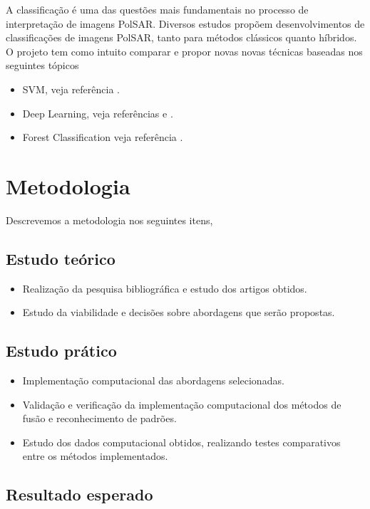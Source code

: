\documentclass[runningheads]{llncs}
\begin{document}
A classificação é uma das questões mais fundamentais no
processo de interpretação de imagens PolSAR. Diversos estudos propõem desenvolvimentos de classificações de imagens PolSAR, tanto para métodos clássicos quanto híbridos. O projeto tem como intuito comparar e propor novas novas técnicas baseadas nos seguintes tópicos 
\begin{itemize}
  \item SVM, veja referência \cite{ref_proc1}.
  \item Deep Learning, veja referências \cite{ref_proc3} e \cite{ztmxzxf}.
  \item Forest Classification veja referência \cite{ref_proc1}.
\end{itemize}

\section{Metodologia}
Descrevemos a metodologia nos seguintes itens,
\subsection{Estudo teórico}
\begin{itemize}
  \item Realização da pesquisa bibliográfica e estudo dos artigos obtidos.
  \item Estudo da viabilidade e decisões sobre abordagens que serão propostas.
\end{itemize}

\subsection{Estudo prático}

\begin{itemize}
  \item Implementação computacional das abordagens selecionadas.
  \item Validação e verificação da implementação computacional dos métodos de fusão e reconhecimento de padrões.
  \item Estudo dos dados computacional obtidos, realizando testes comparativos entre os métodos implementados.
\end{itemize}

\subsection{Resultado esperado}
\end{document}
